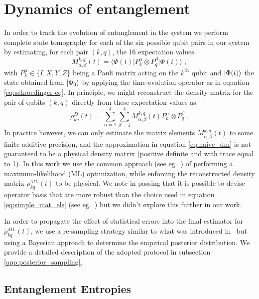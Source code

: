 \documentclass[10pt]{article}
\begin{document}
\section{Dynamics of entanglement}

In order to track the evolution of entanglement in the system we perform complete state tomography for each of the six possible qubit pairs in our system by estimating, for each pair $(k,q)$, the 16 expectation values
\begin{equation}
\label{eq:simple_mat_els}
M^{k,q}_{\alpha,\beta}(t) = \langle \Phi(t)\lvert P_k^\alpha\otimes P_q^\beta \rvert \Phi(t)\rangle\;,
\end{equation}
with $P^{\alpha}_k\in\{I,X,Y,Z\}$ being a Pauli matrix acting on the $k^\text{th}$ qubit and $\ket{\Phi(t)}$ the state obtained from $\ket{\Phi_0}$ by applying the time-evolution operator as in equation \eqref{eq:schroedinger-eq}. In principle, we might reconstruct the density matrix for the pair of qubits $(k,q)$ directly from these expectation values as
\begin{equation}
\label{eq:naive_dm}
{\rho}^D_{kq}(t) = \sum_{\alpha=1}^4\sum_{\beta=1}^4M^{k,q}_{\alpha,\beta}(t)P_k^\alpha\otimes P_q^\beta\;.
\end{equation}
In practice however, we can only estimate the matrix elements $M^{k,q}_{\alpha,\beta}(t)$ to some finite additive precision, and the approximation in equation \eqref{eq:naive_dm} is not guaranteed to be a physical density matrix (positive definite and with trace equal to 1). In this work we use the common approach (see eg.~\cite{Banaszek1999}) of performing a maximum-likelihood (ML) optimization, while enforcing the reconstructed density matrix ${\rho}^{ML}_{kq}(t)$ to be physical. We note in passing that it is possible to devise operator basis that are more robust than the choice used in equation \eqref{eq:simple_mat_els} (see eg.~\cite{Czartowski2020}) but we didn't explore this further in our work.

In order to propagate the effect of statistical errors into the final estimator for ${\rho}^{ML}_{kq}(t)$, we use a re-sampling strategy similar to what was introduced in~\cite{Roggero_nptodg} but using a Bayesian approach to determine the empirical posterior distribution. We provide a detailed description of the adopted protocol in subsection \ref{app:posterior_sampling}.

\subsection{Entanglement Entropies}
\end{document}
